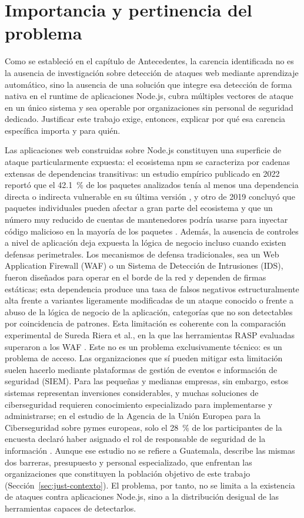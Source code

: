 \section{Importancia y pertinencia del problema}
Como se estableció en el capítulo de Antecedentes, la carencia identificada no es la ausencia de
investigación sobre detección de ataques web mediante aprendizaje automático, sino la ausencia
de una solución que integre esa detección de forma nativa en el runtime de aplicaciones Node.js,
cubra múltiples vectores de ataque en un único sistema y sea operable por organizaciones sin
personal de seguridad dedicado. Justificar este trabajo exige, entonces, explicar por qué esa
carencia específica importa y para quién.

Las aplicaciones web construidas sobre Node.js constituyen una superficie de ataque
particularmente expuesta: el ecosistema npm se caracteriza por cadenas extensas de dependencias transitivas: un estudio
empírico publicado en 2022 reportó que el 42.1~\% de los paquetes analizados tenía al menos una
dependencia directa o indirecta vulnerable en su última versión \cite{zerouali2022impact}, y otro de
2019 concluyó que paquetes individuales pueden afectar a gran parte del ecosistema y que un número
muy reducido de cuentas de mantenedores podría usarse para inyectar código malicioso en la mayoría
de los paquetes \cite{zimmermann2019small}. Además, la ausencia de controles a nivel de aplicación
deja expuesta la lógica de negocio incluso cuando existen defensas perimetrales. Los mecanismos de defensa tradicionales, sea un Web Application Firewall (WAF)
o un Sistema de Detección de Intrusiones (IDS), fueron diseñados para operar en el borde de la red
y dependen de firmas estáticas; esta dependencia produce una tasa de falsos negativos
estructuralmente alta frente a variantes ligeramente modificadas de un ataque conocido o frente a
abuso de la lógica de negocio de la aplicación, categorías que no son detectables por coincidencia de patrones. Esta limitación es coherente con la
comparación experimental de Sureda Riera et al., en la que las herramientas RASP evaluadas superaron
a los WAF \cite{bermejohiguera2022}. Este no es un problema exclusivamente técnico: es un problema de
acceso. Las organizaciones que sí pueden mitigar esta limitación suelen hacerlo mediante plataformas de
gestión de eventos e información de seguridad (SIEM). Para las pequeñas y medianas empresas, sin
embargo, estos sistemas representan inversiones considerables, y muchas soluciones de
ciberseguridad requieren conocimiento especializado para implementarse y administrarse; en el
estudio de la Agencia de la Unión Europea para la Ciberseguridad sobre pymes europeas, solo el
28~\% de los participantes de la encuesta declaró haber asignado el rol de responsable de seguridad
de la información \cite{enisa2021smes}. Aunque ese estudio no se refiere a Guatemala, describe las
mismas dos barreras, presupuesto y personal especializado, que enfrentan las organizaciones que
constituyen la población objetivo de este trabajo (Sección~\ref{sec:just-contexto}). El problema, por tanto, no se limita a la existencia de ataques contra
aplicaciones Node.js, sino a la distribución desigual de las herramientas capaces de detectarlos.

